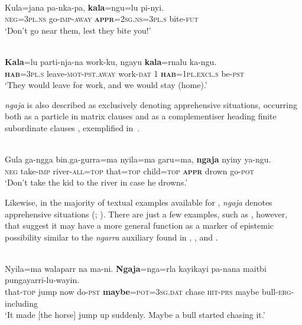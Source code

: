 \documentclass[output=paper,colorlinks,citecolor=brown]{langscibook}
\begin{document}
\ea 
{} \\
\gll Kula=jana pa-nka-pa, \textbf{kala}=ngu=lu pi-nyi. \\
\textsc{neg=3pl.ns} go-\textsc{imp-away} \textsc{\textbf{appr}=2sg.ns=3pl.s} bite-\textsc{fut} \\
\glt `Don't go near them, lest they bite you!' 
\label{ex:bro58}
\z

\newpage
\ea 
{} \\
\gll \textbf{Kala}=lu parti-nja-na work-ku, ngayu \textbf{kala}=rnalu ka-ngu. \\
\textsc{\textbf{hab}=3pl.s} leave-\textsc{mot-pst.away} work-\textsc{dat} 1 \textsc{\textbf{hab}=1pl.excl.s} be-\textsc{pst} \\
\glt `They would leave for work, and we would stay (home).'
\label{ex:bro59}
\z





 \textit{ngaja} is also described as exclusively denoting apprehensive situations, occurring both as a particle in matrix clauses and as a complementiser heading finite subordinate clauses \citep[305, 419]{meakins_grammar_2014}, exemplified in~.

\ea 
{} \\
\gll Gula ga-ngga bin.ga-gurra=ma nyila=ma garu=ma, \textbf{ngaja} nyiny ya-ngu. \\
\textsc{neg} take-\textsc{imp} river-\textsc{all=top} that=\textsc{top} child=\textsc{top} \textsc{\textbf{appr}} drown go-\textsc{pot} \\
\glt `Don't take the kid to the river in case he drowns.'
\label{ex:bro60}
\z

 Likewise, in the majority of textual examples available for , \textit{ngaja} denotes apprehensive situations (\cite[94--95]{mcconvell_gurindji_1996}; \cite[548--550]{meakinsmcconvell2021}). There are just a few examples, such as , however, that suggest it may have a more general function as a marker of epistemic possibility similar to the \textit{ngarra} auxiliary found in , ,  and .

\ea 
{} \\
\gll Nyila=ma walaparr na ma-ni. \textbf{Ngaja}=nga=rla kayikayi pa-nana maitbi pungayarri-lu-wayin. \\
that-\textsc{top} jump now do-\textsc{pst} \textbf{maybe}=\textsc{pot=3sg.dat} chase \textsc{hit-prs} maybe bull-\textsc{erg}-including \\
\glt `It made [the horse] jump up suddenly. Maybe a bull started chasing it.'
\label{ex:bro61}
\z
\end{document}

